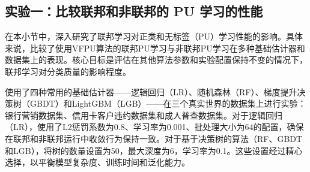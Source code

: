 \subsection{实验一：比较联邦和非联邦的 PU 学习的性能}

在本小节中，深入研究了联邦学习对正类和无标签（PU）学习性能的影响。具体来说，比较了使用VFPU算法的联邦PU学习与非联邦PU学习在多种基础估计器和数据集上的表现。核心目标是评估在其他算法参数和实验配置保持不变的情况下，联邦学习对分类质量的影响程度。

使用了四种常用的基础估计器——逻辑回归（LR）、随机森林（RF）、梯度提升决策树（GBDT）和LightGBM（LGB）——在三个真实世界的数据集上进行实验：银行营销数据集、信用卡客户违约数据集和成人普查数据集。对于逻辑回归（LR），使用了L2惩罚系数为0.8、学习率为0.001、批处理大小为64的配置，确保在联邦和非联邦运行中收敛行为保持一致。对于基于决策树的算法（RF、GBDT和LGB），将树的数量设置为50，最大深度为6，学习率为0.1。这些设置经过精心选择，以平衡模型复杂度、训练时间和泛化能力。
\vspace{-0.1cm}
